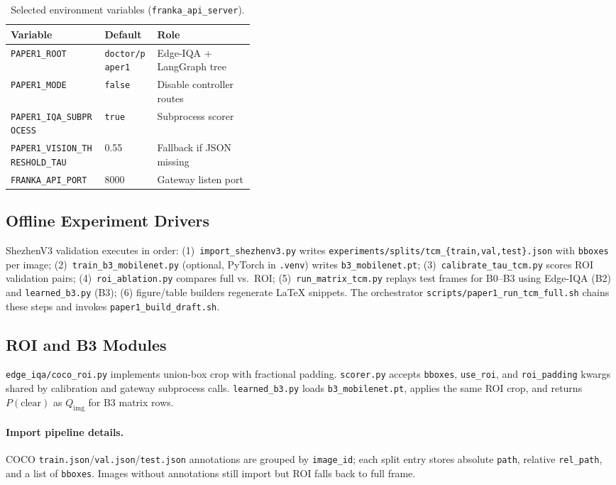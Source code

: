 \begin{table}[t]
\centering
\caption{Selected environment variables (\texttt{franka\_api\_server}).}
\label{tab:env-vars}
\small
\begin{tabular}{llp{0.40\linewidth}}
\hline
Variable & Default & Role \\
\hline
\texttt{PAPER1\_ROOT} & \texttt{doctor/paper1} & Edge-IQA + LangGraph tree \\
\texttt{PAPER1\_MODE} & \texttt{false} & Disable controller routes \\
\texttt{PAPER1\_IQA\_SUBPROCESS} & \texttt{true} & Subprocess scorer \\
\texttt{PAPER1\_VISION\_THRESHOLD\_TAU} & 0.55 & Fallback if JSON missing \\
\texttt{FRANKA\_API\_PORT} & 8000 & Gateway listen port \\
\hline
\end{tabular}
\end{table}

\subsection{Offline Experiment Drivers}
ShezhenV3 validation executes in order: (1)~\texttt{import\_shezhenv3.py} writes \texttt{experiments/splits/tcm\_\{train,val,test\}.json} with \texttt{bboxes} per image; (2)~\texttt{train\_b3\_mobilenet.py} (optional, PyTorch in \texttt{.venv}) writes \texttt{b3\_mobilenet.pt}; (3)~\texttt{calibrate\_tau\_tcm.py} scores ROI validation pairs; (4)~\texttt{roi\_ablation.py} compares full vs.\ ROI; (5)~\texttt{run\_matrix\_tcm.py} replays test frames for B0--B3 using Edge-IQA (B2) and \texttt{learned\_b3.py} (B3); (6) figure/table builders regenerate \LaTeX{} snippets.
The orchestrator \texttt{scripts/paper1\_run\_tcm\_full.sh} chains these steps and invokes \texttt{paper1\_build\_draft.sh}.

\subsection{ROI and B3 Modules}
\texttt{edge\_iqa/coco\_roi.py} implements union-box crop with fractional padding.
\texttt{scorer.py} accepts \texttt{bboxes}, \texttt{use\_roi}, and \texttt{roi\_padding} kwargs shared by calibration and gateway subprocess calls.
\texttt{learned\_b3.py} loads \texttt{b3\_mobilenet.pt}, applies the same ROI crop, and returns $P(\mathrm{clear})$ as $Q_{\mathrm{img}}$ for B3 matrix rows.

\paragraph{Import pipeline details.}
COCO \texttt{train.json}/\texttt{val.json}/\texttt{test.json} annotations are grouped by \texttt{image\_id}; each split entry stores absolute \texttt{path}, relative \texttt{rel\_path}, and a list of \texttt{bboxes}.
Images without annotations still import but ROI falls back to full frame.

